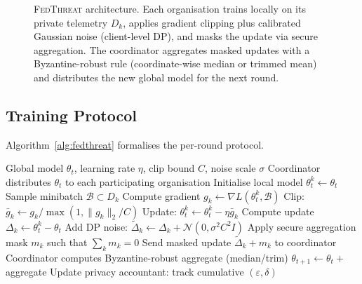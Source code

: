 \documentclass[sigconf,nonacm]{acmart}
\begin{document}
\begin{figure}[t]
\caption{\textsc{FedThreat} architecture. Each organisation trains locally
  on its private telemetry $D_k$, applies gradient clipping plus calibrated
  Gaussian noise (client-level DP), and masks the update via secure
  aggregation. The coordinator aggregates masked updates with a
  Byzantine-robust rule (coordinate-wise median or trimmed mean) and
  distributes the new global model for the next round.}
\label{fig:framework}
\end{figure}

\subsection{Training Protocol}

Algorithm~\ref{alg:fedthreat} formalises the per-round protocol.

\begin{algorithm}[h]
\caption{FedThreat Training Round}
\label{alg:fedthreat}
\begin{algorithmic}[1]
\REQUIRE Global model $\theta_t$, learning rate $\eta$, clip bound $C$, noise scale $\sigma$
\STATE Coordinator distributes $\theta_t$ to each participating organisation
  \STATE Initialise local model $\theta_t^k \leftarrow \theta_t$
    \STATE Sample minibatch $\mathcal{B} \subset D_k$
    \STATE Compute gradient $g_k \leftarrow \nabla L(\theta_t^k, \mathcal{B})$
    \STATE Clip: $\bar{g}_k \leftarrow g_k / \max(1, \|g_k\|_2 / C)$
    \STATE Update: $\theta_t^k \leftarrow \theta_t^k - \eta \bar{g}_k$
  \ENDFOR
  \STATE Compute update $\Delta_k \leftarrow \theta_t^k - \theta_t$
  \STATE Add DP noise: $\tilde{\Delta}_k \leftarrow \Delta_k + \mathcal{N}(0, \sigma^2 C^2 I)$
  \STATE Apply secure aggregation mask $m_k$ such that $\sum_k m_k = 0$
  \STATE Send masked update $\tilde{\Delta}_k + m_k$ to coordinator
\ENDFOR
\STATE Coordinator computes Byzantine-robust aggregate (median/trim)
\STATE $\theta_{t+1} \leftarrow \theta_t + $ aggregate
\STATE Update privacy accountant: track cumulative $(\varepsilon, \delta)$
\end{algorithmic}
\end{algorithm}
\end{document}
